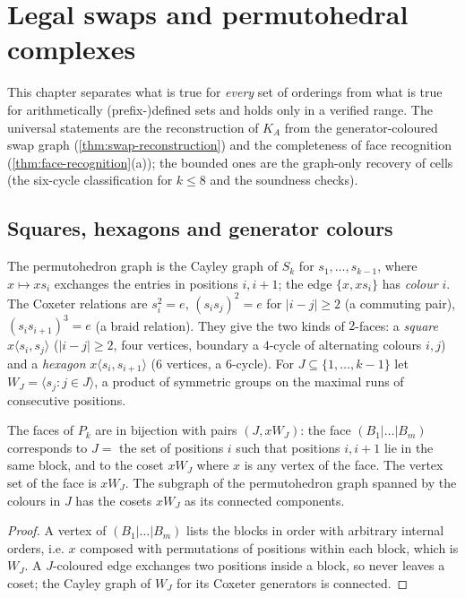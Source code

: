 \chapter{Legal swaps and permutohedral complexes}\label{ch:swaps}

This chapter separates what is true for \emph{every} set of orderings from what is true for arithmetically (prefix-)defined sets and holds only in a verified range. The universal statements are the reconstruction of $K_A$ from the generator-coloured swap graph (\cref{thm:swap-reconstruction}) and the completeness of face recognition (\cref{thm:face-recognition}(a)); the bounded ones are the graph-only recovery of cells (the six-cycle classification for $k\le8$ and the soundness checks).

\section{Squares, hexagons and generator colours}
The permutohedron graph is the Cayley graph of $S_k$ for $s_1,\dots,s_{k-1}$, where $x\mapsto xs_i$ exchanges the entries in positions $i,i{+}1$; the edge $\{x,xs_i\}$ has \emph{colour} $i$. The Coxeter relations are $s_i^2=e$, $(s_is_j)^2=e$ for $|i-j|\ge2$ (a commuting pair), $(s_is_{i+1})^3=e$ (a braid relation). They give the two kinds of $2$-faces: a \emph{square} $x\langle s_i,s_j\rangle$ ($|i-j|\ge2$, four vertices, boundary a $4$-cycle of alternating colours $i,j$) and a \emph{hexagon} $x\langle s_i,s_{i+1}\rangle$ ($6$ vertices, a $6$-cycle). For $J\subseteq\{1,\dots,k-1\}$ let $W_J=\langle s_j:j\in J\rangle$, a product of symmetric groups on the maximal runs of consecutive positions.

\begin{lemma}\label{lem:parabolic}
The faces of $P_k$ are in bijection with pairs $(J,xW_J)$: the face $(B_1|\dots|B_m)$ corresponds to $J=$ the set of positions $i$ such that positions $i,i{+}1$ lie in the same block, and to the coset $xW_J$ where $x$ is any vertex of the face. The vertex set of the face is $xW_J$. The subgraph of the permutohedron graph spanned by the colours in $J$ has the cosets $xW_J$ as its connected components.
\end{lemma}
\begin{proof}
A vertex of $(B_1|\dots|B_m)$ lists the blocks in order with arbitrary internal orders, i.e. $x$ composed with permutations of positions within each block, which is $W_J$. A $J$-coloured edge exchanges two positions inside a block, so never leaves a coset; the Cayley graph of $W_J$ for its Coxeter generators is connected.
\end{proof}

